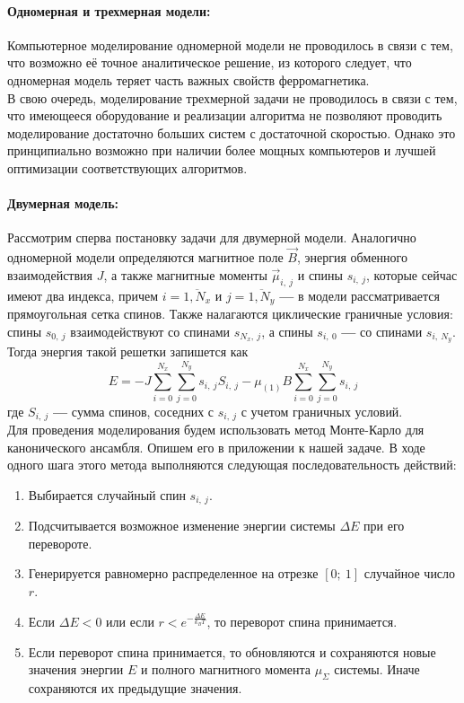 \documentclass[oneside,final,14pt]{extarticle}
\begin{document}
	\paragraph{Одномерная и трехмерная модели:}
	Компьютерное моделирование одномерной модели не проводилось в связи с тем, что возможно её точное аналитическое решение, из которого следует, что одномерная модель теряет часть важных свойств ферромагнетика. \\
	
	\noindent В свою очередь, моделирование трехмерной задачи не проводилось в связи с тем, что имеющееся оборудование и реализации алгоритма не позволяют проводить моделирование достаточно больших систем с достаточной скоростью. Однако это принципиально возможно при наличии более мощных компьютеров и лучшей оптимизации соответствующих алгоритмов.
	
	\paragraph{Двумерная модель:}
	Рассмотрим сперва постановку задачи для двумерной модели. Аналогично одномерной модели определяются магнитное поле $\vec B$, энергия обменного взаимодействия $J$, а также  магнитные моменты $\vec \mu_{i,\ j}$ и спины $s_{i,\ j}$, которые сейчас имеют два индекса, причем $i=\overline{1, N_{x}}$ и $j=\overline{1, N_{y}}$ \textbf{---} в модели рассматривается прямоугольная сетка спинов. Также налагаются циклические граничные условия: спины $s_{0,\ j}$ взаимодействуют со спинами $s_{N_{x}, \ j}$, а спины $s_{i, \ 0}$ \textbf{---} со спинами $s_{i, \ N_{y}}$. Тогда энергия такой решетки запишется как 
	$$E=-J\sum_{i = 0}^{N_{x}}\sum_{j=0}^{N_{y}}s_{i, \ j}S_{i, \ j}-\mu_{(1)}B\sum_{i = 0}^{N_{x}}\sum_{j=0}^{N_{y}}s_{i, \ j}$$
	где $S_{i, \ j}$ \textbf{---} сумма спинов, соседних с $s_{i, \ j}$ с учетом граничных условий. \\
	
	\noindent Для проведения моделирования будем использовать метод Монте-Карло для канонического ансамбля. Опишем его в приложении к нашей задаче. В ходе одного шага этого метода выполняются следующая последовательность действий:
	\begin{enumerate}
		\item Выбирается случайный спин $s_{i, \ j}$.
		\item Подсчитывается возможное изменение энергии системы $\Delta E$ при его перевороте. 
		\item Генерируется равномерно распределенное на отрезке $[0; \ 1]$ случайное число $r$.
		\item Если $\Delta E < 0$ или если $r<e^{-\frac{\Delta E}{k_{B}T}}$, то переворот спина принимается.
		\item Если переворот спина принимается, то обновляются и сохраняются новые значения энергии $E$ и полного магнитного момента $\mu_{\Sigma}$ системы. Иначе сохраняются их предыдущие значения.
	\end{enumerate}
	
\end{document}
